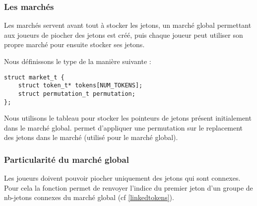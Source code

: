 

\subsubsection{Les marchés}
\label{market}


Les marchés servent avant tout à stocker les jetons, un marché global permettant aux joueurs de piocher des jetons est créé, puis chaque joueur peut utiliser son propre marché pour ensuite stocker ses jetons.


Nous définissons le type  de la manière suivante : 


\begin{lstlisting}[frame=single, caption={implémentation du type struct market\_t}]
struct market_t {
	struct token_t* tokens[NUM_TOKENS];
	struct permutation_t permutation;
};
\end{lstlisting}


Nous utilisons le tableau  pour stocker les pointeurs de jetons présent initialement dans le marché global.  permet d'appliquer une permutation sur le replacement des jetons dans le marché (utilisé pour le marché global).


\subsubsection*{Particularité du marché global}


Les joueurs doivent pouvoir piocher uniquement des jetons qui sont connexes. Pour cela la fonction  permet de renvoyer l'indice du premier jeton d'un groupe de nb-jetons connexes du marché global (cf \ref{linkedtokens}). 